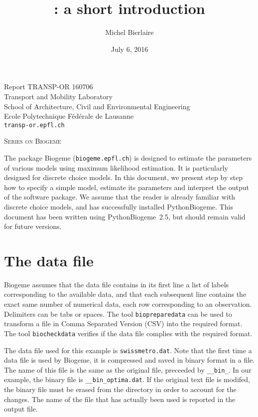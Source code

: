 \documentclass[12pt,a4paper]{article}
\title{\PBIOGEME: a short introduction}
\author{Michel Bierlaire}
\date{July 6, 2016}
\newcommand{\PBIOGEME}{PythonBiogeme}
\newcommand{\BIOGEME}{Biogeme}
\begin{document}
\begin{titlepage}
\pagestyle{empty}

\maketitle
\vspace{2cm}

\begin{center}
\small Report TRANSP-OR 160706 \\ Transport and Mobility Laboratory \\ School of Architecture, Civil and Environmental Engineering \\ Ecole Polytechnique F\'ed\'erale de Lausanne \\ \verb+transp-or.epfl.ch+
\begin{center}
\textsc{Series on Biogeme}
\end{center}
\end{center}


\clearpage
\end{titlepage}

The package Biogeme (\texttt{biogeme.epfl.ch}) is designed to estimate the parameters of
various models using maximum likelihood estimation. It is particularly
designed for discrete choice models. In this document, we present step
by step how to specify a simple model, estimate its parameters and
interpret the output of the software package.  We assume that the
reader is already familiar with discrete choice models, and has
successfully installed \PBIOGEME. This document has been written using
\PBIOGEME\ 2.5, but should remain valid for future versions.  

\section{The data file}

Biogeme assumes that the data file contains in its first line a list
of labels corresponding to the available data, and that each
subsequent line contains the exact same number of numerical data, each
row corresponding to an observation. Delimiters can be tabs or
spaces. The tool \lstinline$biopreparedata$ can be used to transform a
file in Comma Separated Version (CSV) into the required format. The
tool \lstinline$biocheckdata$ verifies if the data file complies with
the required format.


The data file used for this example is \texttt{swissmetro.dat}.
Note that the first time a data file is used by \BIOGEME, it is
compressed and saved in binary format in a file. The name of this file
is the same as the original file, preceeded by \lstinline$__bin_$. In
our example, the binary file is \lstinline$__bin_optima.dat$. If the
original text file is modifed, the binary file must be erased from the
directory in order to account for the changes. The name of the file
that has actually been used is reported in the 
output file.
\end{document}
